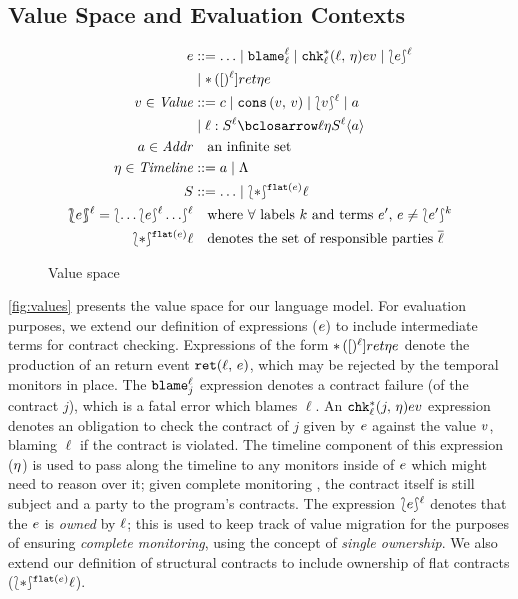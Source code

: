 \subsection{Value Space and Evaluation Contexts}

\begin{figure}
\begin{align*}
\mexp &::= \ldots
 \alt \sblame{\mmlab}{\mmlab}
 \alt \schk*{\mmlab}{\mmlab}{\mtimeline}{\mexp}{\mval}
 \alt \sown{\mexp}{\mmlab} \\
&\alt \sret{\mmlab}{\mtimeline}{\mexp}
\\
\mval \in \Value &::=
      \mconstant
 \alt \vcons{\mval}{\mval}
 \alt \sown{\mval}{\mmlab}
 \alt \maddr \\
&\alt \bclos{\mmlab}{\mscon}{\mmlab}{\mmlab}{\mtimeline}{\mscon}{\mmlab}{\maddr}
\\
\maddr \in \Addr &\quad\text{an infinite set} \\
\mstimeline \in \Timeline &::= \maddr \alt \toplevel
\\
\mscon &::= \ldots
\alt \sown*{\sflat{\mexp}}{\mmlab}
\\
\sOwn{\mexp}{\mmlab} = \sown{ \ldots \sown{\mexp}{\mmlab} \ldots }{\mmlab}
&\quad\text{where $\forall$ labels $k$ and terms $\mexp^\prime$, $\mexp \neq \sown{\mexp^\prime}{k}$}
\\
\sown*{\sflat{\mexp}}{\mmlab} &\quad\text{denotes the set of responsible parties $\overline{\mmlab}$}
\end{align*}
\caption{Value space}
\label{fig:values}
\end{figure}

%
\autoref{fig:values} presents the value space for our language model.
%
For evaluation purposes, we extend our definition of expressions ($e$) to include intermediate terms for contract checking.
%
Expressions of the form ${\tt *}{\,}({[})^{\ell}]{ret}{\eta}{e}$ denote the production of an return event ${\tt ret}(\ell,\, e)$, which may be rejected by the temporal monitors in place.
%
The ${\tt blame}^{\ell}_{j}$ expression denotes a contract failure (of the contract $j$), which is a fatal error which blames $\ell$.
%
An ${\tt chk}{^{*}_{\ell}}({j,\, \eta}){e}{v}$ expression denotes an obligation to check the contract of $j$ given by $e$ against the value $v$, blaming $\ell$ if the contract is violated.
%
The timeline component of this expression ($\eta$) is used to pass along the timeline to any monitors inside of $e$ which might need to reason over it; given complete monitoring \cite{ianjohnson:dthf:complete}, the contract itself is still subject and a party to the program's contracts.
%
The expression $\lbag e\rbag^{\ell}$ denotes that the $e$ is \emph{owned} \cite{ianjohnson:dthf:complete} by $\ell$; this is used to keep track of value migration for the purposes of ensuring \emph{complete monitoring}, using the concept of \emph{single ownership}.
%
We also extend our definition of structural contracts to include ownership of flat contracts ($\sown*{\sflat{\mexp}}{\mmlab}$).

